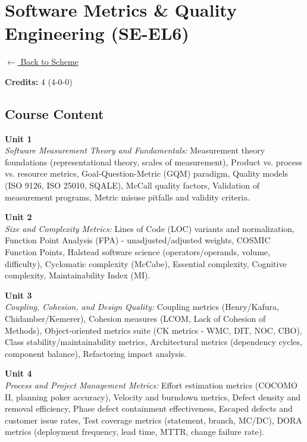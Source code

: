 \section*{Software Metrics \& Quality Engineering (SE-EL6)}
\label{elec:SE_6}

\noindent \small{\hyperref[main:scheme]{$\leftarrow$ Back to Scheme}} \vspace{0.5cm}

\noindent \textbf{Credits:} 4 (4-0-0)

\subsection*{Course Content}
\noindent\textbf{Unit 1} \\
\textit{Software Measurement Theory and Fundamentals:} Measurement theory foundations (representational theory, scales of measurement), Product vs. process vs. resource metrics, Goal-Question-Metric (GQM) paradigm, Quality models (ISO 9126, ISO 25010, SQALE), McCall quality factors, Validation of measurement programs, Metric misuse pitfalls and validity criteria.

\vspace{0.3cm}

\noindent\textbf{Unit 2} \\
\textit{Size and Complexity Metrics:} Lines of Code (LOC) variants and normalization, Function Point Analysis (FPA) - unadjusted/adjusted weights, COSMIC Function Points, Halstead software science (operators/operands, volume, difficulty), Cyclomatic complexity (McCabe), Essential complexity, Cognitive complexity, Maintainability Index (MI).

\vspace{0.3cm}

\noindent\textbf{Unit 3} \\
\textit{Coupling, Cohesion, and Design Quality:} Coupling metrics (Henry/Kafura, Chidamber/Kemerer), Cohesion measures (LCOM, Lack of Cohesion of Methods), Object-oriented metrics suite (CK metrics - WMC, DIT, NOC, CBO), Class stability/maintainability metrics, Architectural metrics (dependency cycles, component balance), Refactoring impact analysis.

\vspace{0.3cm}

\noindent\textbf{Unit 4} \\
\textit{Process and Project Management Metrics:} Effort estimation metrics (COCOMO II, planning poker accuracy), Velocity and burndown metrics, Defect density and removal efficiency, Phase defect containment effectiveness, Escaped defects and customer issue rates, Test coverage metrics (statement, branch, MC/DC), DORA metrics (deployment frequency, lead time, MTTR, change failure rate).

